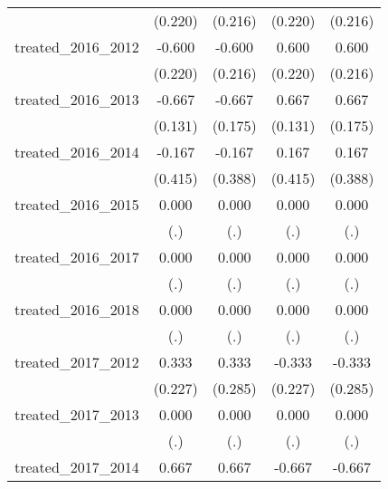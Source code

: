{\begin{tabular}{l*{4}{c}}
            &     (0.220)         &     (0.216)         &     (0.220)         &     (0.216)         \\
[1em]
treated\_2016\_2012&      -0.600\sym{**} &      -0.600\sym{**} &       0.600\sym{**} &       0.600\sym{**} \\
            &     (0.220)         &     (0.216)         &     (0.220)         &     (0.216)         \\
[1em]
treated\_2016\_2013&      -0.667\sym{***}&      -0.667\sym{***}&       0.667\sym{***}&       0.667\sym{***}\\
            &     (0.131)         &     (0.175)         &     (0.131)         &     (0.175)         \\
[1em]
treated\_2016\_2014&      -0.167         &      -0.167         &       0.167         &       0.167         \\
            &     (0.415)         &     (0.388)         &     (0.415)         &     (0.388)         \\
[1em]
treated\_2016\_2015&       0.000         &       0.000         &       0.000         &       0.000         \\
            &         (.)         &         (.)         &         (.)         &         (.)         \\
[1em]
treated\_2016\_2017&       0.000         &       0.000         &       0.000         &       0.000         \\
            &         (.)         &         (.)         &         (.)         &         (.)         \\
[1em]
treated\_2016\_2018&       0.000         &       0.000         &       0.000         &       0.000         \\
            &         (.)         &         (.)         &         (.)         &         (.)         \\
[1em]
treated\_2017\_2012&       0.333         &       0.333         &      -0.333         &      -0.333         \\
            &     (0.227)         &     (0.285)         &     (0.227)         &     (0.285)         \\
[1em]
treated\_2017\_2013&       0.000         &       0.000         &       0.000         &       0.000         \\
            &         (.)         &         (.)         &         (.)         &         (.)         \\
[1em]
treated\_2017\_2014&       0.667\sym{**} &       0.667\sym{*}  &      -0.667\sym{**} &      -0.667\sym{*}  \\

\end{tabular}}
